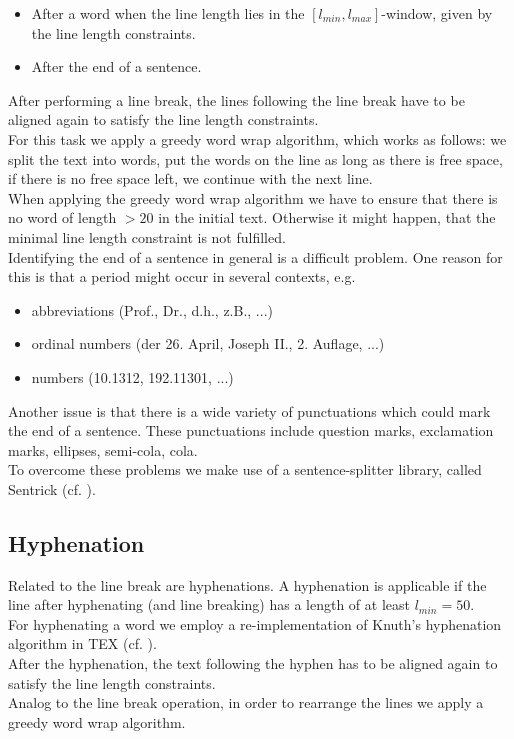 \documentclass{reportAlternative}
\begin{document}
\begin{itemize}
	\item After a word when the line length lies in the $[l_{min},l_{max}]$-window, 
	given by the line length constraints.
	\item After the end of a sentence.
\end{itemize} 
After performing a line break, the lines following the line break have
to be aligned again to satisfy the line length constraints.\\
For this task we apply a greedy word wrap algorithm, which works as follows: we split the text into words,
put the words on the line as long as there is free space, if there is no free space left, we continue with the next line.\\
When applying the greedy word wrap algorithm we have to ensure that
there is no word of length $> 20$ in the initial text. Otherwise it might happen, that the minimal line
length constraint is not fulfilled.\\
Identifying the end of a sentence in general is a difficult problem. One reason for this is that a period
might occur in several contexts, e.g. 

\begin{itemize}

	\item abbreviations (Prof., Dr., d.h., z.B., ...)
	
	\item ordinal numbers (der 26. April, Joseph II., 2. Auflage, ...)
	
	\item numbers (10.1312, 192.11301, ...)
	
\end{itemize}
Another issue is that there is a wide variety of punctuations which could mark the end of a sentence. These punctuations include question marks, exclamation marks, ellipses, semi-cola, cola.\\
To overcome these problems we make use of a sentence-splitter library, called Sentrick (cf. \cite{Sentrick}).


\subsection{Hyphenation}
 Related to the line break are hyphenations. A hyphenation is applicable if the line after hyphenating (and line breaking) has a length of at least $l_{min}=50$.\\ For hyphenating a word we employ a re-implementation of Knuth's hyphenation algorithm in TEX (cf. \cite{Hyphenation}). \\
After the hyphenation, the text following the hyphen has to be aligned again to satisfy the line length constraints.\\
Analog to the line break operation, in order to rearrange the lines we apply a greedy word wrap algorithm.
\end{document}
